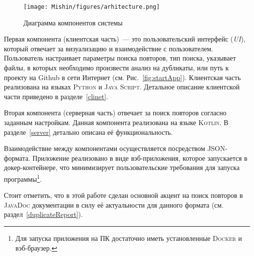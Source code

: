 \begin{figure}[H]
    \texttt{[image: Mishin/figures/arhitecture.png]}
    \caption{Диаграмма компонентов системы}\label{fig:application}
\end{figure}


Первая компонента (клиентская часть)~--- это пользовательский интерфейс (\emph{UI}), который отвечает за визуализацию и взаимодействие с пользователем.
Пользователь настраивает параметры поиска повторов, тип поиска, указывает файлы, в которых необходимо произвести анализ на дубликаты, или путь к проекту на Github в сети Интернет (см. Рис.~\ref{fig:startApp}).
Клиентская часть реализована на языках \textsc{Python} и \textsc{Java Script}.
Детальное описание клиентской части приведено в разделе~\ref{clinet}.

Вторая компонента (серверная часть) отвечает за поиск повторов согласно заданным настройкам.
Данная компонента реализована на языке \textsc{Kotlin}.
В разделе~\ref{server} детально описана её функциональность.

Взаимодействие между компонентами осуществляется посредством \textsc{JSON}-формата.
Приложение реализовано в виде вэб-приложения, которое запускается в докер-контейнере, что минимизирует пользовательские требования для запуска программы\footnote{Для запуска приложения на ПК достаточно иметь установленные \textsc{Docker} и вэб-браузер.}.

Стоит отметить, что в этой работе сделан основной акцент на поиск повторов в \textsc{JavaDoc} документации в силу её актуальности для данного формата (см. раздел~\ref{duplicateReport}).

